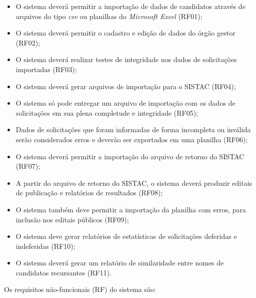 \documentclass[
	12pt,			%
	openright,		%
	oneside,	
	a4paper,		%
	english,		%
	brazil			%
]{abntex2/abntex2}  %
\begin{document}
		\begin{itemize}

			\item O sistema deverá permitir a importação de dados de candidatos através de arquivos do tipo \textit{csv} ou planilhas do \textit{Microsoft Excel} (RF01);
			\item O sistema deverá permitir o cadastro e edição de dados do órgão gestor (RF02);
			\item O sistema deverá realizar testes de integridade nos dados de solicitações importadas (RF03);
			\item O sistema deverá gerar arquivos de importação para o SISTAC (RF04);
			\item O sistema só pode entregar um arquivo de importação com os dados de solicitações em sua plena completude e integridade (RF05);
			\item Dados de solicitações que foram informadas de forma incompleta ou inválida serão considerados erros e deverão ser exportados em uma planilha (RF06);
			\item O sistema deverá permitir a importação do arquivo de retorno do SISTAC (RF07);
			\item A partir do arquivo de retorno do SISTAC, o sistema deverá produzir editais de publicação e relatórios de resultados (RF08);
			\item O sistema também deve permitir a importação da planilha com erros, para inclusão nos editais públicos (RF09);
			\item O sistema deve gerar relatórios de estatísticas de solicitações deferidas e indeferidas (RF10);
			\item O sistema deverá gerar um relatório de similaridade entre nomes de candidatos recursantes (RF11).
			
		\end{itemize}
	
		Os requisitos não-funcionais (RF) do sistema são:
	
\end{document}

